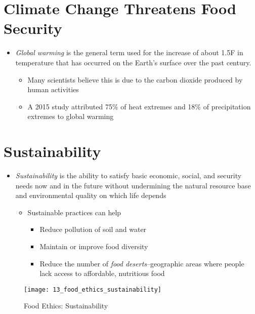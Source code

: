 \documentclass[title={Chapter 13}]{fdsn201notes}
\begin{document}
\section{Climate Change Threatens Food Security}\label{sec:climate-change-threatens-food-security}
\begin{itemize}
	\item \emph{Global warming} is the general term used for the increase of about 1.5\textdegree{}F in temperature that has occurred on the Earth’s surface over the past century.
	\begin{itemize}
		\item Many scientists believe this is due to the carbon dioxide produced by human activities
		\item A 2015 study attributed 75\% of heat extremes and 18\% of precipitation extremes to global warming
	\end{itemize}
\end{itemize}

\section{Sustainability}\label{sec:sustainability}
\begin{itemize}
	\item \emph{Sustainability} is the ability to satisfy basic economic, social, and security needs now and in the future without undermining the natural resource base and environmental quality on which life depends
	\begin{itemize}
		\item Sustainable practices can help
		\begin{itemize}
			\item Reduce pollution of soil and water
			\item Maintain or improve food diversity
			\item Reduce the number of \emph{food deserts}--geographic areas where people lack access to affordable, nutritious food
		\end{itemize}
	\end{itemize}
\end{itemize}

\begin{figure}[H]
	\centering
	\texttt{[image: 13\_food\_ethics\_sustainability]}
	\caption{Food Ethics: Sustainability}
	\label{fig:food_ethics_sustainability}
\end{figure}
\end{document}
